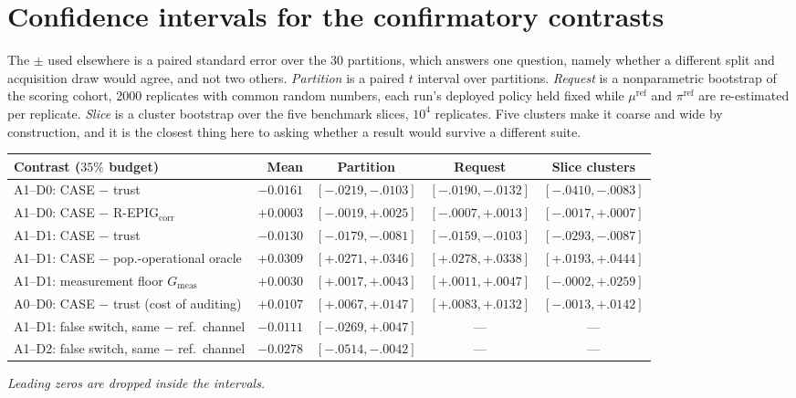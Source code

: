 \documentclass{article}
\theoremstyle{plain}
\theoremstyle{remark}
\newcommand{\muref}{\mu^{\mathrm{ref}}}
\newcommand{\piref}{\pi^{\mathrm{ref}}}
\newcommand{\Gmeas}{G_{\mathrm{meas}}}
\begin{document}
\section{Confidence intervals for the confirmatory contrasts}\label{app:ci}
The $\pm$ used elsewhere is a paired standard error over the $30$ partitions, which answers one
question, namely whether a different split and acquisition draw would agree, and not two others.
\emph{Partition} is a paired $t$ interval over partitions. \emph{Request} is a nonparametric bootstrap
of the scoring cohort, $2000$ replicates with common random numbers, each run's deployed policy held
fixed while $\muref$ and $\piref$ are re-estimated per replicate. \emph{Slice} is a cluster bootstrap
over the five benchmark slices, $10^4$ replicates. Five clusters make it coarse and wide by
construction, and it is the closest thing here to asking whether a result would survive a different
suite.

\begin{center}\scriptsize\setlength{\tabcolsep}{3.2pt}
\begin{tabular}{@{}lrccc@{}}
\toprule
Contrast ($35\%$ budget) & Mean & Partition & Request & Slice clusters\\
\midrule
A1--D0: CASE $-$ trust & $-0.0161$ & $[-.0219,-.0103]$ & $[-.0190,-.0132]$ & $[-.0410,-.0083]$\\
A1--D0: CASE $-$ R-EPIG$_{\mathrm{corr}}$ & $+0.0003$ & $[-.0019,+.0025]$ & $[-.0007,+.0013]$ & $[-.0017,+.0007]$\\
A1--D1: CASE $-$ trust & $-0.0130$ & $[-.0179,-.0081]$ & $[-.0159,-.0103]$ & $[-.0293,-.0087]$\\
A1--D1: CASE $-$ pop.-operational oracle & $+0.0309$ & $[+.0271,+.0346]$ & $[+.0278,+.0338]$ & $[+.0193,+.0444]$\\
A1--D1: measurement floor $\Gmeas$ & $+0.0030$ & $[+.0017,+.0043]$ & $[+.0011,+.0047]$ & $\mathbf{[-.0002,+.0259]}$\\
A0--D0: CASE $-$ trust (cost of auditing) & $+0.0107$ & $[+.0067,+.0147]$ & $[+.0083,+.0132]$ & $\mathbf{[-.0013,+.0142]}$\\
\addlinespace[2pt]
A1--D1: false switch, same $-$ ref.\ channel & $-0.0111$ & $[-.0269,+.0047]$ & --- & ---\\
A1--D2: false switch, same $-$ ref.\ channel & $-0.0278$ & $[-.0514,-.0042]$ & --- & ---\\
\bottomrule
\end{tabular}
\end{center}
\noindent\emph{Leading zeros are dropped inside the intervals.}
\end{document}
